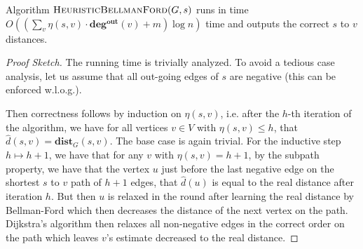 \begin{theorem}
Algorithm $\textsc{HeuristicBellmanFord}(G,s)$ runs in time $O((\sum_v \eta(s,v) \cdot \mathbf{deg^{out}}(v) + m) \log n)$ time and outputs the correct $s$ to $v$ distances.
\end{theorem}
\begin{proof}[Proof Sketch]
The running time is trivially analyzed. To avoid a tedious case analysis, let us assume that all out-going edges of $s$ are negative (this can be enforced w.l.o.g.). 

Then correctness follows by induction on $\eta(s,v)$, i.e. after the $h$-th iteration of the algorithm, we have for all vertices $v \in V$ with $\eta(s,v) \leq h$, that $\hat{d}(s,v) = \mathbf{dist}_G(s,v)$. The base case is again trivial. For the inductive step $h \mapsto h+1$, we have that for any $v$ with $\eta(s,v) = h+1$, by the subpath property, we have that the vertex $u$ just before the last negative edge on the shortest $s$ to $v$ path of $h+1$ edges, that $\hat{d}(u)$ is equal to the real distance after iteration $h$. But then $u$ is relaxed in the round after learning the real distance by Bellman-Ford which then decreases the distance of the next vertex on the path. Dijkstra's algorithm then relaxes all non-negative edges in the correct order on the path which leaves $v$'s estimate decreased to the real distance. 
\end{proof}



